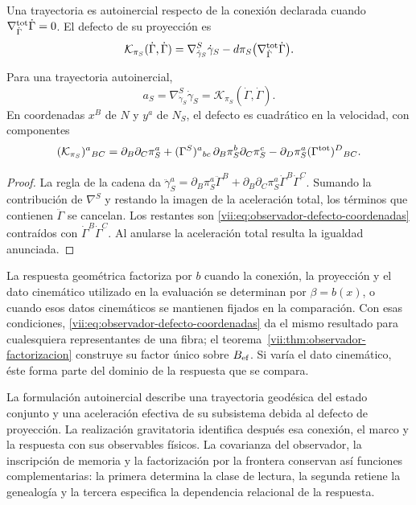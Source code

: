 \begin{definition}
\label{vii:def:observador-autoinercia}
Una trayectoria es autoinercial respecto de la conexión declarada
cuando \(\nabla^{\rm tot}_{\dot\Gamma}\dot\Gamma=0\).
El defecto de su proyección es
\begin{equation}
 \mathcal K_{\pi_S}(\dot\Gamma,\dot\Gamma)
 =\nabla^S_{\dot\gamma_S}\dot\gamma_S
  -d\pi_S\bigl(\nabla^{\rm tot}_{\dot\Gamma}\dot\Gamma\bigr).
 \label{vii:eq:observador-defecto-proyeccion}
\end{equation}
\end{definition}

\begin{proposition}
\label{vii:prop:observador-aceleracion}
Para una trayectoria autoinercial,
\[
 a_S=\nabla^S_{\dot\gamma_S}\dot\gamma_S
     =\mathcal K_{\pi_S}(\dot\Gamma,\dot\Gamma).
\]
En coordenadas \(x^B\) de \(N\) y \(y^a\) de \(N_S\), el
defecto es cuadrático en la velocidad, con componentes
\begin{equation}
 (\mathcal K_{\pi_S})^a{}_{BC}
 =\partial_B\partial_C\pi_S^a
  +(\Gamma^S)^a{}_{bc}\,
        \partial_B\pi_S^b\partial_C\pi_S^c
  -\partial_D\pi_S^a(\Gamma^{\rm tot})^D{}_{BC}.
 \label{vii:eq:observador-defecto-coordenadas}
\end{equation}
\end{proposition}

\begin{proof}
La regla de la cadena da
\(\ddot\gamma_S^a=\partial_B\pi_S^a\ddot\Gamma^B
 +\partial_B\partial_C\pi_S^a\dot\Gamma^B\dot\Gamma^C\).
Sumando la contribución de \(\nabla^S\) y restando la imagen de
la aceleración total, los términos que contienen \(\ddot\Gamma\)
se cancelan. Los restantes son
\eqref{vii:eq:observador-defecto-coordenadas} contraídos con
\(\dot\Gamma^B\dot\Gamma^C\). Al anularse la aceleración total
resulta la igualdad anunciada.
\end{proof}

La respuesta geométrica factoriza por \(b\) cuando la conexión,
la proyección y el dato cinemático utilizado en la evaluación se
determinan por \(\beta=b(x)\), o cuando esos datos cinemáticos se
mantienen fijados en la comparación. Con esas condiciones,
\eqref{vii:eq:observador-defecto-coordenadas} da el mismo resultado
para cualesquiera representantes de una fibra; el
teorema~\ref{vii:thm:observador-factorizacion} construye su factor
único sobre \(B_{\rm ef}\). Si varía el dato cinemático, éste
forma parte del dominio de la respuesta que se compara.

La formulación autoinercial describe una trayectoria geodésica del
estado conjunto y una aceleración efectiva de su subsistema debida
al defecto de proyección. La realización gravitatoria identifica
después esa conexión, el marco y la respuesta con sus observables
físicos. La covarianza del observador, la inscripción de memoria y
la factorización por la frontera conservan así funciones complementarias:
la primera determina la clase de lectura, la segunda retiene la
genealogía y la tercera especifica la dependencia relacional de la
respuesta.
